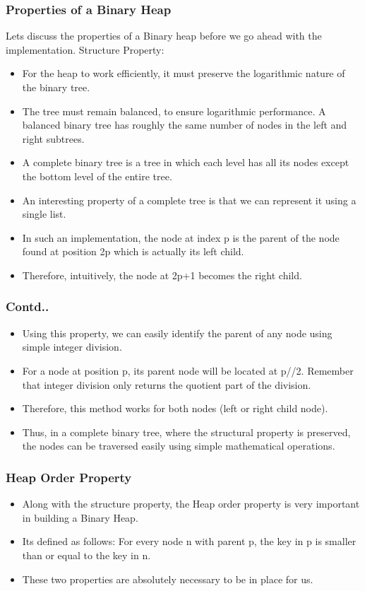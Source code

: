 \documentclass{beamer}
\begin{document}
\begin{frame}
\frametitle{Properties of a Binary Heap}
Lets discuss the properties of a Binary heap before we go ahead with the implementation.
Structure Property:
\begin{itemize}
\item For the heap to work efficiently, it must preserve the logarithmic nature of the binary tree.
\item The tree must remain balanced, to ensure logarithmic performance. A balanced binary tree has roughly the same number of nodes in the left and right subtrees.
\item A complete binary tree is a tree in which each level has all its nodes except the bottom level of the entire tree.
\item An interesting property of a complete tree is that we can represent it using a single list.
\item In such an implementation, the node at index p is the parent of the node found at position 2p which is actually its left child.
\item Therefore, intuitively, the node at 2p+1 becomes the right child.
\end{itemize}
\end{frame}

\begin{frame}
\frametitle{Contd..}
\begin{itemize}
\item Using this property, we can easily identify the parent of any node using simple integer division.
\item For a node at position p, its parent node will be located at p//2. Remember that integer division only returns the quotient part of the division.
\item Therefore, this method works for both nodes (left or right child node).
\item Thus, in a complete binary tree, where the structural property is preserved, the nodes can be traversed easily using simple mathematical operations.
\end{itemize}
\end{frame}

\begin{frame}
\frametitle{Heap Order Property}
\begin{itemize}
\item Along with the structure property, the Heap order property is very important in building a Binary Heap.
\item Its defined as follows: For every node n with parent p, the key in p is smaller than or equal to the key in n.
\item These two properties are absolutely necessary to be in place for us.
\end{itemize}
\end{frame}
\end{document}
